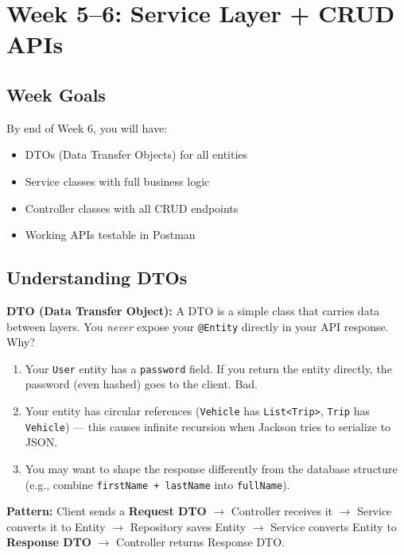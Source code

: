 \documentclass[12pt,a4paper]{report}
\newcommand{\code}[1]{\texttt{\textcolor{keywordblue}{#1}}}
\begin{document}
\chapter{Week 5--6: Service Layer + CRUD APIs}

\section{Week Goals}

By end of Week 6, you will have:
\begin{itemize}
  \item DTOs (Data Transfer Objects) for all entities
  \item Service classes with full business logic
  \item Controller classes with all CRUD endpoints
  \item Working APIs testable in Postman
\end{itemize}

\section{Understanding DTOs}

\begin{tcolorbox}[notebox]
\textbf{DTO (Data Transfer Object):} A DTO is a simple class that carries data between layers. You \textit{never} expose your \code{@Entity} directly in your API response. Why?

\begin{enumerate}
  \item Your \code{User} entity has a \code{password} field. If you return the entity directly, the password (even hashed) goes to the client. Bad.
  \item Your entity has circular references (\code{Vehicle} has \code{List<Trip>}, \code{Trip} has \code{Vehicle}) --- this causes infinite recursion when Jackson tries to serialize to JSON.
  \item You may want to shape the response differently from the database structure (e.g., combine \code{firstName + lastName} into \code{fullName}).
\end{enumerate}

\textbf{Pattern:} Client sends a \textbf{Request DTO} $\rightarrow$ Controller receives it $\rightarrow$ Service converts it to Entity $\rightarrow$ Repository saves Entity $\rightarrow$ Service converts Entity to \textbf{Response DTO} $\rightarrow$ Controller returns Response DTO.
\end{tcolorbox}
\end{document}
